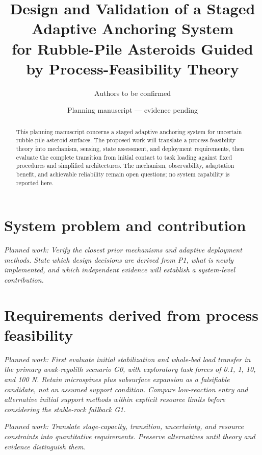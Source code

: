 \documentclass[11pt]{article}
\title{Design and Validation of a Staged Adaptive Anchoring System\\
for Rubble-Pile Asteroids Guided by Process-Feasibility Theory}
\author{Authors to be confirmed}
\date{Planning manuscript --- evidence pending}
\newcommand{\planned}[1]{\par\noindent\textit{Planned work: #1}\par}
\begin{document}
\maketitle

\begin{abstract}
This planning manuscript concerns a staged adaptive anchoring system for
uncertain rubble-pile asteroid surfaces. The proposed work will translate a
process-feasibility theory into mechanism, sensing, state assessment, and
deployment requirements, then evaluate the complete transition from initial
contact to task loading against fixed procedures and simplified architectures.
The mechanism, observability, adaptation benefit, and achievable reliability
remain open questions; no system capability is reported here.
\end{abstract}

\section{System problem and contribution}
\planned{Verify the closest prior mechanisms and adaptive deployment methods.
State which design decisions are derived from P1, what is newly implemented,
and which independent evidence will establish a system-level contribution.}

\section{Requirements derived from process feasibility}

\planned{First evaluate initial stabilization and whole-bed load transfer in
the primary weak-regolith scenario G0, with exploratory task forces of 0.1, 1,
10, and 100 N. Retain microspines plus subsurface expansion as a falsifiable
candidate, not an assumed support condition. Compare low-reaction entry and
alternative initial support methods within explicit resource limits before
considering the stable-rock fallback G1.}
\planned{Translate stage-capacity, transition, uncertainty, and resource
constraints into quantitative requirements. Preserve alternatives until theory
and evidence distinguish them.}
\end{document}
